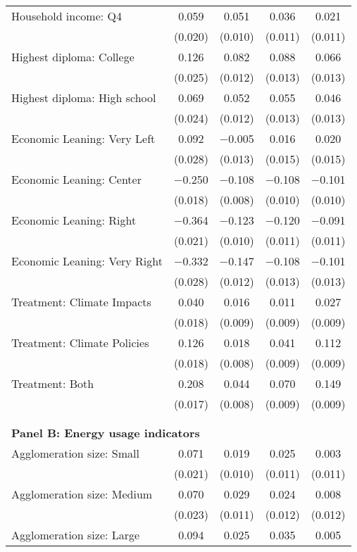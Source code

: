 \begin{tabular}{@{\extracolsep{5pt}}lcccc}
  Household income: Q4 & 0.059 & 0.051 & 0.036 & 0.021 \\ 
  & (0.020) & (0.010) & (0.011) & (0.011) \\ 
  Highest diploma: College & 0.126 & 0.082 & 0.088 & 0.066 \\ 
  & (0.025) & (0.012) & (0.013) & (0.013) \\ 
  Highest diploma: High school & 0.069 & 0.052 & 0.055 & 0.046 \\ 
  & (0.024) & (0.012) & (0.013) & (0.013) \\ 
  Economic Leaning: Very Left & 0.092 & $-$0.005 & 0.016 & 0.020 \\ 
  & (0.028) & (0.013) & (0.015) & (0.015) \\ 
  Economic Leaning: Center & $-$0.250 & $-$0.108 & $-$0.108 & $-$0.101 \\ 
  & (0.018) & (0.008) & (0.010) & (0.010) \\ 
  Economic Leaning: Right & $-$0.364 & $-$0.123 & $-$0.120 & $-$0.091 \\ 
  & (0.021) & (0.010) & (0.011) & (0.011) \\ 
  Economic Leaning: Very Right & $-$0.332 & $-$0.147 & $-$0.108 & $-$0.101 \\ 
  & (0.028) & (0.012) & (0.013) & (0.013) \\ 
  Treatment: Climate Impacts & 0.040 & 0.016 & 0.011 & 0.027 \\ 
  & (0.018) & (0.009) & (0.009) & (0.009) \\ 
  Treatment: Climate Policies & 0.126 & 0.018 & 0.041 & 0.112 \\ 
  & (0.018) & (0.008) & (0.009) & (0.009) \\ 
  Treatment: Both & 0.208 & 0.044 & 0.070 & 0.149 \\ 
  & (0.017) & (0.008) & (0.009) & (0.009) \\ 
 \\[1ex] \hline \\[1ex]
\multicolumn{ 5 }{l}{\textbf{ Panel B: Energy usage indicators }} \\
  Agglomeration size: Small & 0.071 & 0.019 & 0.025 & 0.003 \\ 
  & (0.021) & (0.010) & (0.011) & (0.011) \\ 
  Agglomeration size: Medium & 0.070 & 0.029 & 0.024 & 0.008 \\ 
  & (0.023) & (0.011) & (0.012) & (0.012) \\ 
  Agglomeration size: Large & 0.094 & 0.025 & 0.035 & 0.005 \\ 

\end{tabular}

